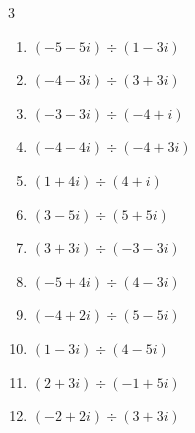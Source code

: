 \begin{multicols}{3}
\begin{enumerate}
  \item $\displaystyle (-5-5i)\div(1-3i)$

        \phantom{$\displaystyle =1-2i$}

  \item $\displaystyle (-4-3i)\div(3+3i)$


  \item $\displaystyle (-3-3i)\div(-4+i)$


  \item $\displaystyle (-4-4i)\div(-4+3i)$


\columnbreak %

  \item $\displaystyle (1+4i)\div(4+i)$


  \item $\displaystyle (3-5i)\div(5+5i)$


  \item $\displaystyle (3+3i)\div(-3-3i)$

        \phantom{$\displaystyle =-1$}

  \item $\displaystyle (-5+4i)\div(4-3i)$


  \item $\displaystyle (-4+2i)\div(5-5i)$


  \item $\displaystyle (1-3i)\div(4-5i)$


  \item $\displaystyle (2+3i)\div(-1+5i)$


  \item $\displaystyle (-2+2i)\div(3+3i)$


\end{enumerate}
\end{multicols}
